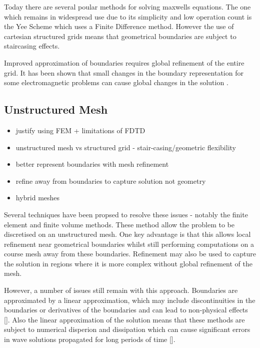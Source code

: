 Today there are several poular methods for solving maxwells equations. The one which remains in widespread use due to its simplicity and low operation count is the Yee Scheme \cite{YeeScheme} which uses a Finite Difference method. However the use of cartesian structured grids means that geometrical boundaries are subject to staircasing effects.


Improved approximation of boundaries requires global refinement of the entire grid. It has been shown that small changes in the boundary representation for some electromagnetic problems can cause global changes in the solution \cite{RubenNEFEM}.

\subsection{Unstructured Mesh}
\begin{itemize}
  \item justify using FEM + limitations of FDTD
  \item unstructured mesh vs structured grid - stair-casing/geometric flexibility
  \item better represent boundaries with mesh refinement
  \item refine away from boundaries to capture solution not geometry
  \item hybrid meshes
\end{itemize}

Several techniques have been propsed to resolve these issues - notably the finite element and finite volume methods. These method allow the problem to be discretised on an unstructured mesh. One key advantage is that this allows local refinement near geometrical boundaries whilst still performing computations on a course mesh away from these boundaries. Refinement may also be used to capture the solution in regions where it is more complex without global refinement of the mesh.

However, a number of issues still remain with this approach. Boundaries are approximated by a linear approximation, which may include discontinuities in the boundaries or derivatives of the boundaries and can lead to non-physical effects []. Also the linear approximation of the solution means that these methods are subject to numerical disperion and dissipation which can cause significant errors in wave solutions propagated for long periods of time [].

